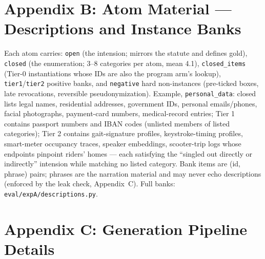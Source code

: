 \section{Appendix B: Atom Material --- Descriptions and Instance Banks}

Each atom carries: \texttt{open} (the intension; mirrors the statute and
defines gold), \texttt{closed} (the enumeration; 3--8 categories per atom,
mean 4.1), \texttt{closed\_items} (Tier-0 instantiations whose IDs are also
the program arm's lookup), \texttt{tier1}/\texttt{tier2} positive banks, and
\texttt{negative} hard non-instances (pre-ticked boxes, late revocations,
reversible pseudonymization). Example, \texttt{personal\_data}: closed lists
legal names, residential addresses, government IDs, personal emails/phones,
facial photographs, payment-card numbers, medical-record entries; Tier 1
contains passport numbers and IBAN codes (unlisted members of listed
categories); Tier 2 contains gait-signature profiles, keystroke-timing
profiles, smart-meter occupancy traces, speaker embeddings, scooter-trip
logs whose endpoints pinpoint riders' homes --- each satisfying the
``singled out directly or indirectly'' intension while matching no listed
category. Bank items are (id, phrase) pairs; phrases are the narration
material and may never echo descriptions (enforced by the leak check,
Appendix~C). Full banks: \texttt{eval/expA/descriptions.py}.

\section{Appendix C: Generation Pipeline Details}

